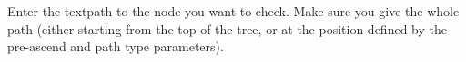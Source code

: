 Enter the textpath to the node you want to check. Make sure you give the whole path (either starting from the top of the tree, or at the position defined by the pre-ascend and path type parameters).



